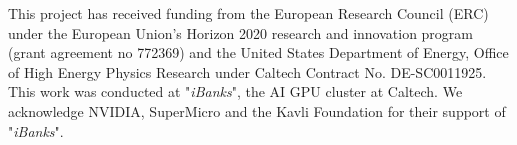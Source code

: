 
\maketitle










\begin{acknowledgments}
This project has received funding from the European Research Council (ERC) under the European Union’s Horizon 2020 research and innovation program (grant agreement no 772369) and the United States Department of Energy, Office of High Energy Physics Research under Caltech Contract No. DE-SC0011925. This work was conducted at "\textit{iBanks}", the AI GPU cluster at Caltech. We acknowledge NVIDIA, SuperMicro and the Kavli Foundation for their support of "\textit{iBanks}".
\end{acknowledgments}

